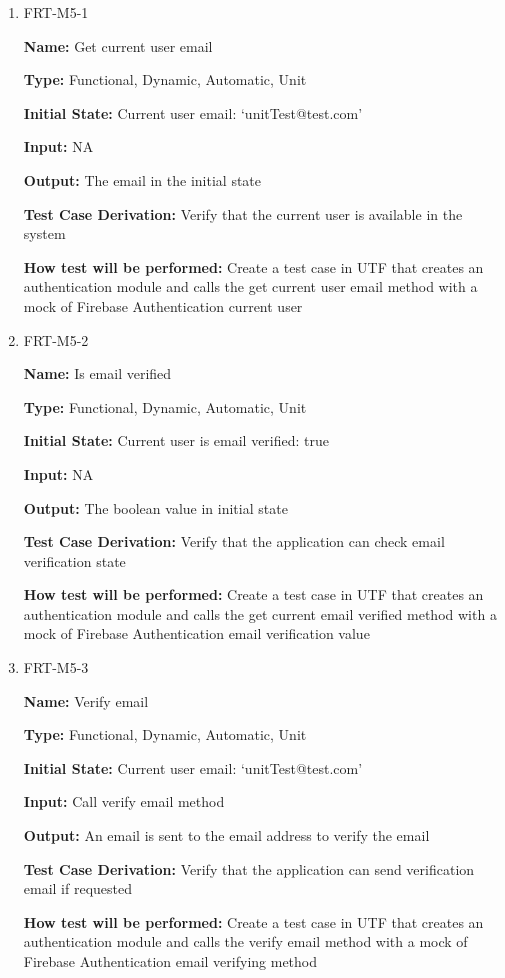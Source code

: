 \documentclass[12pt, titlepage]{article}
\begin{document}
\begin{enumerate}
\item{FRT-M5-1}

\textbf{Name:} Get current user email

\textbf{Type:} Functional, Dynamic, Automatic, Unit
					
\textbf{Initial State:} Current user email: `unitTest@test.com'
					
\textbf{Input:} NA
					
\textbf{Output:} The email in the initial state

\textbf{Test Case Derivation:} Verify that the current user is available in the system

\textbf{How test will be performed:} Create a test case in UTF that creates an authentication module and calls the get current user email method with a mock of Firebase Authentication current user

\item{FRT-M5-2}

\textbf{Name:} Is email verified

\textbf{Type:} Functional, Dynamic, Automatic, Unit
					
\textbf{Initial State:} Current user is email verified: true
					
\textbf{Input:} NA
					
\textbf{Output:} The boolean value in initial state

\textbf{Test Case Derivation:} Verify that the application can check email verification state

\textbf{How test will be performed:} Create a test case in UTF that creates an authentication module and calls the get current email verified method with a mock of Firebase Authentication email verification value

\item{FRT-M5-3}

\textbf{Name:} Verify email

\textbf{Type:} Functional, Dynamic, Automatic, Unit
					
\textbf{Initial State:} Current user email: `unitTest@test.com'
					
\textbf{Input:} Call verify email method
					
\textbf{Output:} An email is sent to the email address to verify the email

\textbf{Test Case Derivation:} Verify that the application can send verification email if requested

\textbf{How test will be performed:} Create a test case in UTF that creates an authentication module and calls the verify email method with a mock of Firebase Authentication email verifying method
\end{enumerate}
\end{document}

